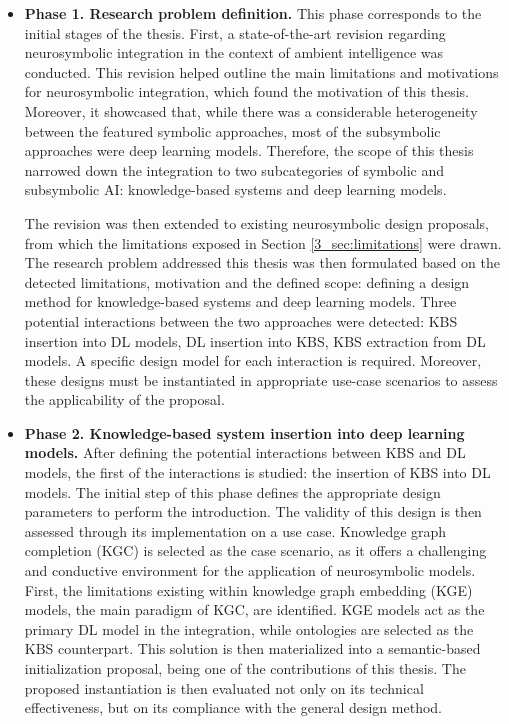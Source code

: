 \begin{itemize}
    \item \textbf{Phase 1. Research problem definition.} This phase corresponds to the initial stages of the thesis. First, a state-of-the-art revision regarding neurosymbolic integration in the context of ambient intelligence was conducted. This revision helped outline the main limitations and motivations for neurosymbolic integration, which found the motivation of this thesis. Moreover, it showcased that, while there was a considerable heterogeneity between the featured symbolic approaches, most of the subsymbolic approaches were deep learning models. Therefore, the scope of this thesis narrowed down the integration to two subcategories of symbolic and subsymbolic AI: knowledge-based systems and deep learning models. 
    
    The revision was then extended to existing neurosymbolic design proposals, from which the limitations exposed in Section \ref{3_sec:limitations} were drawn. The research problem addressed this thesis was then formulated based on the detected limitations, motivation and the defined scope: defining a design method for knowledge-based systems and deep learning models. Three potential interactions between the two approaches were detected: KBS insertion into DL models, DL insertion into KBS, KBS extraction from DL models. A specific design model for each interaction is required. Moreover, these designs must be instantiated in appropriate use-case scenarios to assess the applicability of the proposal.
    
    \item \textbf{Phase 2. Knowledge-based system insertion into deep learning models.} After defining the potential interactions between KBS and DL models, the first of the interactions is studied: the insertion of KBS into DL models. The initial step of this phase defines the appropriate design parameters to perform the introduction. The validity of this design is then assessed through its implementation on a use case. Knowledge graph completion (KGC) is selected as the case scenario, as it offers a challenging and conductive environment for the application of neurosymbolic models. First, the limitations existing within knowledge graph embedding (KGE) models, the main paradigm of KGC, are identified. KGE models act as the primary DL model in the integration, while ontologies are selected as the KBS counterpart. This solution is then materialized into a semantic-based initialization proposal, being one of the contributions of this thesis. The proposed instantiation is then evaluated not only on its technical effectiveness, but on its compliance with the general design method.
    

\end{itemize}
